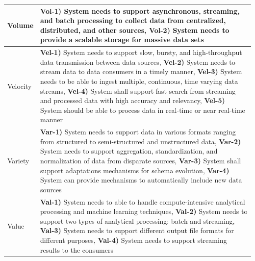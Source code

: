 \documentclass[conference]{IEEEtran}
\begin{document}
    \begin{table}[h]
    \centering
    \renewcommand*{\arraystretch}{1.8}
    \begin{tabular}{|m{1.2cm}|m{16cm}|}

        \hline

        Volume &

        \textbf{Vol-1)} System needs to support asynchronous, streaming, and batch processing to collect data from centralized, distributed, and other sources, \textbf{Vol-2)} System needs to provide a scalable storage for massive data sets 
        \\
        \hline
        Velocity & 
        
        \textbf{Vel-1)} System needs to support slow, bursty, and high-throughput data transmission between data sources, \textbf{Vel-2)} System needs to stream data to data consumers in a timely manner, \textbf{Vel-3)} System needs to be able to ingest multiple, continuous, time varying data streams, \textbf{Vel-4)} System shall support fast search from streaming and processed data with high accuracy and relevancy, \textbf{Vel-5)} System should be able to process data in real-time or near real-time manner 
        \\ 

        \hline

        Variety & 

        \textbf{Var-1)} System needs to support data in various formats ranging from structured to semi-structured and unstructured data, \textbf{Var-2)} System needs to support aggregation, standardization, and normalization of data from disparate sources, \textbf{Var-3)} System shall support adaptations mechanisms for schema evolution, \textbf{Var-4)} System can provide mechanisms to automatically include new data sources 
        \\

        \hline

        Value & 
        
        \textbf{Val-1)} System needs to able to handle compute-intensive analytical processing and machine learning techniques, \textbf{Val-2)} System needs to support two types of analytical processing: batch and streaming, \textbf{Val-3)} System needs to support different output file formats for different purposes, \textbf{Val-4)} System needs to support streaming results to the consumers 
        \\


\end{tabular}
\end{table}
\end{document}
